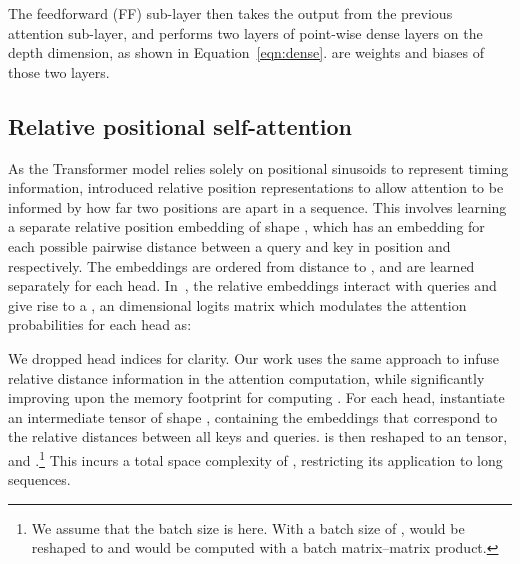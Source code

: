 \documentclass{article} \usepackage{iclr2019_conference,times}
\begin{document}
\fi
The feedforward (FF) sub-layer then takes the output  from the previous attention sub-layer, and performs two layers of point-wise dense layers on the depth  dimension, as shown in Equation~\ref{eqn:dense}.   are weights and biases of those two layers.



\subsection{Relative positional self-attention} \label{subsec:relposatt}

As the Transformer model relies solely on positional sinusoids to represent timing information, \cite{shaw2018self} introduced relative position representations to allow attention to be informed by how far two positions are apart in a sequence.  This involves learning a separate relative position embedding  of shape , which has an embedding for each possible pairwise distance  between a query and key in position  and  respectively. The embeddings are ordered from distance  to , and are learned separately for each head. In~\cite{shaw2018self}, the relative embeddings interact with queries and give rise to a , an  dimensional logits matrix which modulates the attention probabilities for each head as:

We dropped head indices for clarity. Our work uses the same approach to infuse relative distance information in the attention computation, while significantly improving upon the memory footprint for computing .
For each head, \cite{shaw2018self} instantiate an intermediate tensor  of shape , containing the embeddings that correspond to the relative distances between all keys and queries.
 is then reshaped to an  tensor, and .\footnote{We assume that the batch size is  here. With a batch size of ,  would be reshaped to  and  would be computed with a batch matrix--matrix product.}
This incurs a total space complexity of , restricting its application to long sequences.

\iffalse
To use these embeddings, an intermediate tensor  of shape  is instantiated to gather for each  by  position, the embedding that corresponds to their relative distance  - .


 
Dropping head indices for clarity, the attention operation for each head is now

\fi
\end{document}
